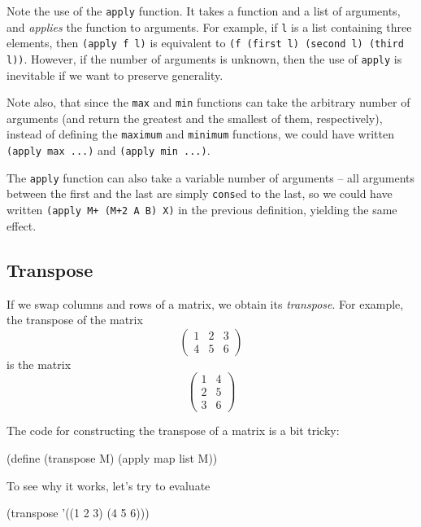 Note the use of the \texttt{apply} function. It takes
a function and a list of arguments, and \textit{applies}
the function to arguments. For example, if \texttt{l}
is a list containing three elements, then
\texttt{(apply f l)} is equivalent to
\texttt{(f (first l) (second l) (third l))}. However,
if the number of arguments is unknown, then the use
of \texttt{apply} is inevitable if we want to preserve
generality.

Note also, that since the \texttt{max} and \texttt{min}
functions can take the arbitrary number of arguments
(and return the greatest and the smallest of them,
respectively), instead of defining the \texttt{maximum}
and \texttt{minimum} functions, we could have written
\texttt{(apply max ...)} and \texttt{(apply min ...)}.

The \texttt{apply} function can also take a variable
number of arguments -- all arguments between the first
and the last are simply \texttt{cons}ed to the last,
so we could have written \texttt{(apply M+ (M+2 A B) X)}
in the previous definition, yielding the same effect.

\subsection{Transpose}
If we swap columns and rows of a matrix, we obtain
its \textit{transpose}. For example, the transpose
of the matrix
\begin{equation*}
  \begin{pmatrix}
    1 & 2 & 3 \\
    4 & 5 & 6 
  \end{pmatrix}
\end{equation*}
is the matrix
\begin{equation*}
  \begin{pmatrix}
    1 & 4 \\
    2 & 5 \\
    3 & 6
  \end{pmatrix}
\end{equation*}

The code for constructing the transpose of a matrix is
a bit tricky:

\begin{Snippet}
(define (transpose M)
  (apply map list M))
\end{Snippet}

To see why it works, let's try to evaluate
\begin{Snippet}
(transpose '((1 2 3)
             (4 5 6)))
\end{Snippet}

